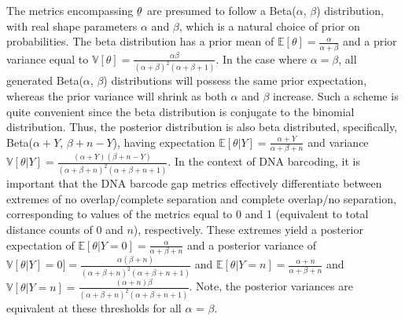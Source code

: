 \documentclass[12pt]{article}
\begin{document}
The metrics encompassing $\underaccent{\bar}{\theta} $ are presumed to follow a Beta($\alpha$, $\beta$) distribution, with real shape parameters $\alpha$ and $\beta$, which is a natural choice of prior on probabilities. The beta distribution has a prior mean of $\mathbb{E}[\theta] = \frac{\alpha}{\alpha + \beta}$ and a prior variance equal to $\mathbb{V}[\theta] = \frac{\alpha\beta}{(\alpha + \beta)^2(\alpha + \beta + 1)}$. In the case where $\alpha = \beta$, all generated Beta($\alpha$, $\beta$) distributions will possess the same prior expectation, whereas the prior variance will shrink as both $\alpha$ and $\beta$ increase. Such a scheme is quite convenient since the beta distribution is conjugate to the binomial distribution. Thus, the posterior distribution is also beta distributed, specifically, Beta($\alpha + Y$, $\beta + n - Y$), having expectation $\mathbb{E}[\theta|Y] = \frac{\alpha + Y}{\alpha + \beta + n}$ and variance $\mathbb{V}[\theta|Y] = \frac{(\alpha + Y)(\beta + n - Y)}{(\alpha + \beta + n)^2(\alpha + \beta + n + 1)}$. In the context of DNA barcoding, it is important that the DNA barcode gap metrics effectively differentiate between extremes of no overlap/complete separation and complete overlap/no separation, corresponding to values of the metrics equal to 0 and 1 (equivalent to total distance counts of 0 and $n$), respectively. These extremes yield a posterior expectation of $\mathbb{E}[\theta|Y = 0] = \frac{\alpha}{\alpha + \beta + n}$ and a posterior variance of $\mathbb{V}[\theta|Y] = 0] = \frac{\alpha(\beta + n)}{(\alpha + \beta + n)^2(\alpha + \beta + n + 1)}$ and $\mathbb{E}[\theta|Y = n] = \frac{\alpha + n}{\alpha + \beta + n}$ and $\mathbb{V}[\theta|Y = n] = \frac{(\alpha + n)\beta}{(\alpha + \beta + n)^2(\alpha + \beta + n + 1)}$. Note, the posterior variances are equivalent at these thresholds for all $\alpha$ = $\beta$.
\end{document}
